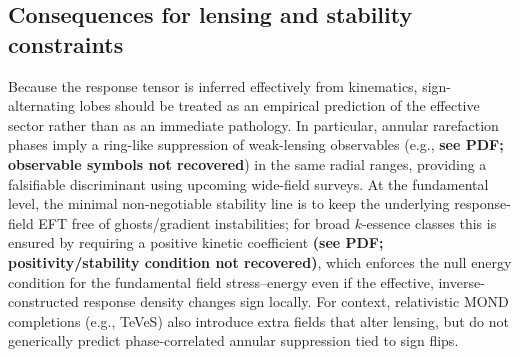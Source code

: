 \subsection{Consequences for lensing and stability constraints}

Because the response tensor is inferred effectively from kinematics, sign-alternating lobes should be treated as an empirical prediction of the effective sector rather than as an immediate pathology. In particular, annular rarefaction phases imply a ring-like suppression of weak-lensing observables (e.g., \textbf{see PDF; observable symbols not recovered}) in the same radial ranges, providing a falsifiable discriminant using upcoming wide-field surveys. At the fundamental level, the minimal non-negotiable stability line is to keep the underlying response-field EFT free of ghosts/gradient instabilities; for broad $k$-essence classes this is ensured by requiring a positive kinetic coefficient \textbf{(see PDF; positivity/stability condition not recovered)}, which enforces the null energy condition for the fundamental field stress--energy even if the effective, inverse-constructed response density changes sign locally. For context, relativistic MOND completions (e.g., TeVeS) also introduce extra fields that alter lensing, but do not generically predict phase-correlated annular suppression tied to sign flips.
